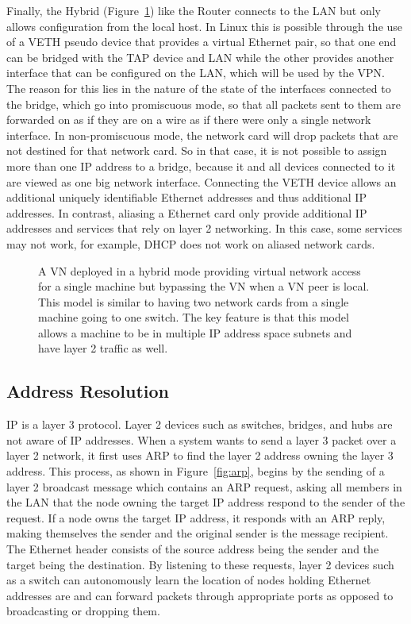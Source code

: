 Finally, the Hybrid (Figure~\ref{fig:hybrid}) like the Router connects to the
LAN but only allows configuration from the local host.  In Linux this is
possible through the use of a VETH pseudo device that provides a virtual
Ethernet pair, so that one end can be bridged with the TAP device and LAN while
the other provides another interface that can be configured on the LAN, which
will be used by the VPN.  The reason for this lies in the nature of the state
of the interfaces connected to the bridge, which go into promiscuous mode, so
that all packets sent to them are forwarded on as if they are on a wire as if
there were only a single network interface.  In non-promiscuous mode, the
network card will drop packets that are not destined for that network card.  So
in that case, it is not possible to assign more than one IP address to a
bridge, because it and all devices connected to it are viewed as one big
network interface.  Connecting the VETH device allows an additional uniquely
identifiable Ethernet addresses and thus additional IP addresses.  In contrast,
aliasing a Ethernet card only provide additional IP addresses and services that
rely on layer 2 networking. In this case, some services may not work, for
example, DHCP does not work on aliased network cards.

\begin{figure}
\centering
{}
\caption[VN Hybrid]{A VN deployed in a hybrid mode providing virtual network
access for a single machine but bypassing the VN when a VN peer is local.  This
model is similar to having two network cards from a single machine going to one
switch.  The key feature is that this model allows a machine to be in multiple
IP address space subnets and have layer 2 traffic as well.}
\label{fig:hybrid}
\end{figure}

\subsection{Address Resolution}
\label{vpns:arp}

IP is a layer 3 protocol. Layer 2 devices such as switches, bridges, and hubs
are not aware of IP addresses.  When a system wants to send a layer 3 packet
over a layer 2 network, it first uses ARP to find the layer 2 address owning
the layer 3 address.  This process, as shown in Figure~\ref{fig:arp}, begins by
the sending of a layer 2 broadcast message which contains an ARP request,
asking all members in the LAN that the node owning the target IP address
respond to the sender of the request.  If a node owns the target IP address, it
responds with an ARP reply, making themselves the sender and the original
sender is the message recipient.  The Ethernet header consists of the source
address being the sender and the target being the destination.  By listening to
these requests, layer 2 devices such as a switch can autonomously learn the
location of nodes holding Ethernet addresses are and can forward packets
through appropriate ports as opposed to broadcasting or dropping them.

